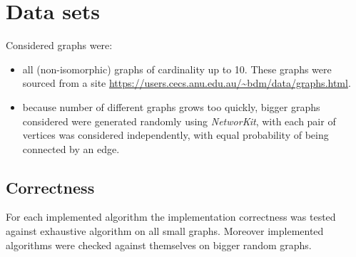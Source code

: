 \section{Data sets}
Considered graphs were: 
\begin{itemize}
    \item all (non-isomorphic) graphs of cardinality up to 10. These graphs were sourced from a site \url{https://users.cecs.anu.edu.au/~bdm/data/graphs.html}.
    \item because number of different graphs grows too quickly, bigger graphs considered were generated randomly using \textit{NetworKit}, with each pair of vertices was considered independently, with equal probability of being connected by an edge. 
\end{itemize}
\subsection{Correctness}
For each implemented algorithm the implementation correctness was tested against exhaustive algorithm on all small graphs. Moreover implemented algorithms were checked against themselves on bigger random graphs.

